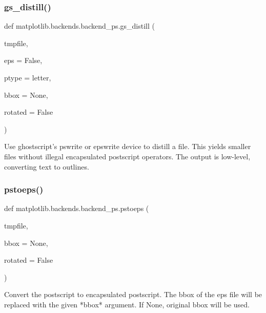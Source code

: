 \subsubsection{\texorpdfstring{gs\+\_\+distill()}{gs\_distill()}}
{\footnotesize\ttfamily def matplotlib.\+backends.\+backend\+\_\+ps.\+gs\+\_\+distill (\begin{DoxyParamCaption}\item[{}]{tmpfile,  }\item[{}]{eps = {\ttfamily False},  }\item[{}]{ptype = {\ttfamily \textquotesingle{}letter\textquotesingle{}},  }\item[{}]{bbox = {\ttfamily None},  }\item[{}]{rotated = {\ttfamily False} }\end{DoxyParamCaption})}

\begin{DoxyVerb}Use ghostscript's pswrite or epswrite device to distill a file.
This yields smaller files without illegal encapsulated postscript
operators. The output is low-level, converting text to outlines.
\end{DoxyVerb}
 \mbox{\label{namespacematplotlib_1_1backends_1_1backend__ps_abf2b9867da37a4a872b54cc23f9a8c86}} 
\subsubsection{\texorpdfstring{pstoeps()}{pstoeps()}}
{\footnotesize\ttfamily def matplotlib.\+backends.\+backend\+\_\+ps.\+pstoeps (\begin{DoxyParamCaption}\item[{}]{tmpfile,  }\item[{}]{bbox = {\ttfamily None},  }\item[{}]{rotated = {\ttfamily False} }\end{DoxyParamCaption})}

\begin{DoxyVerb}Convert the postscript to encapsulated postscript.  The bbox of
the eps file will be replaced with the given *bbox* argument. If
None, original bbox will be used.
\end{DoxyVerb}
 \mbox{\label{namespacematplotlib_1_1backends_1_1backend__ps_a31f00859c83b0ee81dc0c94f7b04fa3a}} 
